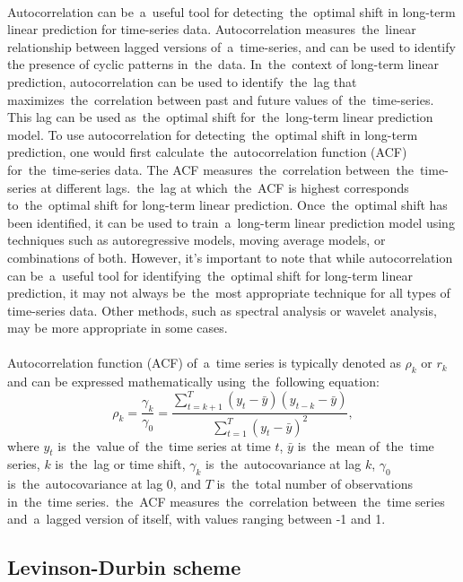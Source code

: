 \\
Autocorrelation can be~a~useful tool for detecting~the~optimal shift in long-term linear prediction for time-series data.
Autocorrelation measures~the~linear relationship between lagged versions of~a~time-series, and can be used to identify
the presence of cyclic patterns in~the~data. In~the~context of long-term linear prediction, autocorrelation can be
used to identify~the~lag that maximizes~the~correlation between past and future values of~the~time-series. This lag can
be used as~the~optimal shift for~the~long-term linear prediction model. To use autocorrelation for detecting~the~optimal
shift in long-term prediction, one would first calculate~the~autocorrelation function (ACF) for~the~time-series data.
The ACF measures~the~correlation between~the~time-series at different lags.~the~lag at which~the~ACF is highest
corresponds to~the~optimal shift for long-term linear prediction. Once~the~optimal shift has been identified, it can
be used to train~a~long-term linear prediction model using techniques such as autoregressive models, moving average
models, or combinations of both. However, it's important to note that while autocorrelation can be~a~useful tool for
identifying~the~optimal shift for long-term linear prediction, it may not always be~the~most appropriate technique for
all types of time-series data. Other methods, such as spectral analysis or wavelet analysis, may be more
appropriate in some cases.\\
\\
Autocorrelation function (ACF) of~a~time series is typically denoted as $\rho_k$ or $r_k$ and can be expressed
mathematically using~the~following equation:
\begin{equation}
    \rho_k = \frac{\gamma_k}{\gamma_0} = \frac{\sum_{t=k+1}^{T}(y_t - \bar{y})(y_{t-k} - \bar{y})}{\sum_{t=1}^{T}(y_t - \bar{y})^2},
\end{equation}
where $y_t$ is~the~value of~the~time series at time $t$, $\bar{y}$ is~the~mean of~the~time series, $k$ is~the~lag or
time shift, $\gamma_k$ is~the~autocovariance at lag $k$, $\gamma_0$ is~the~autocovariance at lag 0, and $T$ is~the~total number
of observations in~the~time series.~the~ACF measures~the~correlation between~the~time series and~a~lagged version of
itself, with values ranging between -1 and 1.

\subsection{Levinson-Durbin scheme} \label{subsec:levinson}

